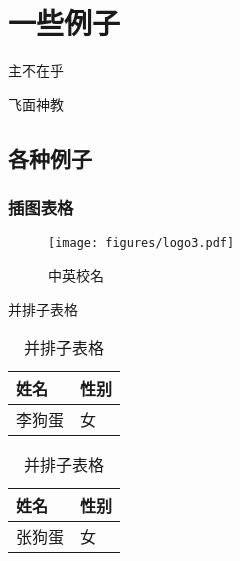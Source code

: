 \chapter{一些例子}

\epigraph{主不在乎}{飞面神教}

\section{各种例子}
\subsection{插图表格}
\begin{figure}[htbp]
    \centering\texttt{[image: figures/logo3.pdf]}
    \caption[中英校名]{中英校名}
\end{figure}
\begin{table}[htbp]
    \noindent\begin{minipage}{0.5\textwidth}
        \centering
        \caption{并排子表格}
        \label{tab:parallel1}
        \begin{tabular}{p{2cm}p{2cm}}
            \toprule[1.5pt]
            姓名 & 性别 \\\midrule[1pt]
            李狗蛋 & 女 \\\bottomrule[1.5pt]
        \end{tabular}
    \end{minipage}
    \begin{minipage}{0.5\textwidth}
        \centering
        \caption{并排子表格}
        \label{tab:parallel2}
        \begin{tabular}{p{2cm}p{2cm}}
            \toprule[1.5pt]
            姓名 & 性别 \\\midrule[1pt]
            张狗蛋 & 女 \\\bottomrule[1.5pt]
        \end{tabular}
    \end{minipage}
\end{table}
\begin{table}[htbp]
    \centering
    \caption{并排子表格}
    \label{tab:subtable}
    \hskip2cm
\end{table}

